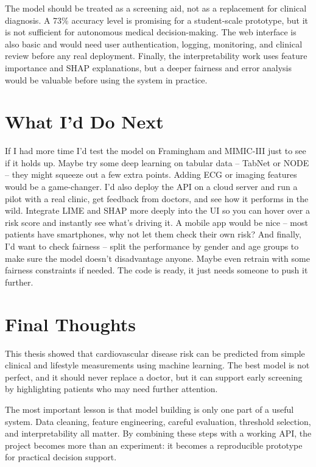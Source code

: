 \documentclass[12pt, a4paper, oneside]{book}
\begin{document}
The model should be treated as a screening aid, not as a replacement for clinical diagnosis. A 73\% accuracy level is promising for a student-scale prototype, but it is not sufficient for autonomous medical decision-making. The web interface is also basic and would need user authentication, logging, monitoring, and clinical review before any real deployment. Finally, the interpretability work uses feature importance and SHAP explanations, but a deeper fairness and error analysis would be valuable before using the system in practice.

\section{What I'd Do Next}
If I had more time I'd test the model on Framingham and MIMIC-III just to see if it holds up. Maybe try some deep learning on tabular data -- TabNet or NODE -- they might squeeze out a few extra points. Adding ECG or imaging features would be a game-changer. I'd also deploy the API on a cloud server and run a pilot with a real clinic, get feedback from doctors, and see how it performs in the wild. Integrate LIME and SHAP more deeply into the UI so you can hover over a risk score and instantly see what's driving it. A mobile app would be nice -- most patients have smartphones, why not let them check their own risk? And finally, I'd want to check fairness -- split the performance by gender and age groups to make sure the model doesn't disadvantage anyone. Maybe even retrain with some fairness constraints if needed. The code is ready, it just needs someone to push it further.

\section{Final Thoughts}
This thesis showed that cardiovascular disease risk can be predicted from simple clinical and lifestyle measurements using machine learning. The best model is not perfect, and it should never replace a doctor, but it can support early screening by highlighting patients who may need further attention.

The most important lesson is that model building is only one part of a useful system. Data cleaning, feature engineering, careful evaluation, threshold selection, and interpretability all matter. By combining these steps with a working API, the project becomes more than an experiment: it becomes a reproducible prototype for practical decision support.
\end{document}
